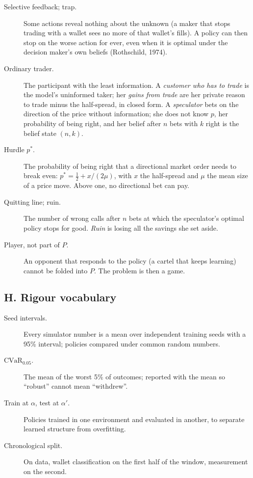 \begin{description}
\item[Selective feedback; trap.] Some actions reveal nothing about the unknown (a maker that stops trading with a wallet sees no more of that wallet's fills). A policy can then stop on the worse action for ever, even when it is optimal under the decision maker's own beliefs (Rothschild, 1974).
\item[Ordinary trader.] The participant with the least information. A \emph{customer who has to trade} is the model's uninformed taker; her \emph{gains from trade} are her private reason to trade minus the half-spread, in closed form. A \emph{speculator} bets on the direction of the price without information; she does not know $p$, her probability of being right, and her belief after $n$ bets with $k$ right is the belief state $(n,k)$.
\item[Hurdle $p^*$.] The probability of being right that a directional market order needs to break even: $p^*=\tfrac12+x/(2\mu)$, with $x$ the half-spread and $\mu$ the mean size of a price move. Above one, no directional bet can pay.
\item[Quitting line; ruin.] The number of wrong calls after $n$ bets at which the speculator's optimal policy stops for good. \emph{Ruin} is losing all the savings she set aside.
\item[Player, not part of $P$.] An opponent that responds to the policy (a cartel that keeps learning) cannot be folded into $P$. The problem is then a game.
\end{description}

\subsection*{H. Rigour vocabulary}
\begin{description}
\item[Seed intervals.] Every simulator number is a mean over independent training seeds with a 95\% interval; policies compared under common random numbers.
\item[$\mathrm{CVaR}_{0.05}$.] The mean of the worst 5\% of outcomes; reported with the mean so ``robust'' cannot mean ``withdrew''.
\item[Train at $\alpha$, test at $\alpha'$.] Policies trained in one environment and evaluated in another, to separate learned structure from overfitting.
\item[Chronological split.] On data, wallet classification on the first half of the window, measurement on the second.
\end{description}

